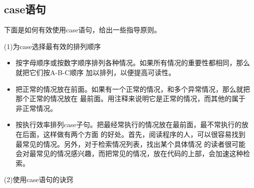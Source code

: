 \documentclass{article}
\begin{document}
\subsection{case语句}
下面是如何有效使用case语句，给出一些指导原则。
\par
(1)为case选择最有效的排列顺序
\par
\begin{itemize}
    \item 按字母顺序或按数字顺序排列各种情况。如果所有情况的重要性都相同，那么就把它们按A-B-C顺序
    加以排列，以便提高可读性。
    \item 把正常的情况放在前面。如果有一个正常的情况，和多个异常情况，那么就把那个正常的情况放在
    最前面。用注释来说明它是正常的情况，而其他的属于非正常情况。
    \item 按执行效率排列case子句。把最经常执行的情况放在最前面，最不常执行的放在后面，这样做有两个方面
    的好处。首先，阅读程序的人，可以很容易找到最常见的情况。另外，对于检索情况列表，找出某个具体情况
    的读者很可能会对最常见的情况感兴趣，而把常见的情况，放在代码的上部，会加速这种检索。
\end{itemize}
\par
(2)使用case语句的诀窍
\par
\end{document}
